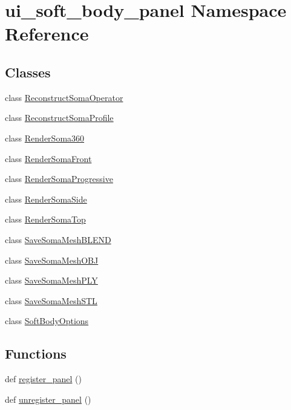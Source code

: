 \hypertarget{namespaceui__soft__body__panel}{}\section{ui\+\_\+soft\+\_\+body\+\_\+panel Namespace Reference}
\label{namespaceui__soft__body__panel}
\subsection*{Classes}
\begin{DoxyCompactItemize}
\item 
class \hyperlink{classui__soft__body__panel_1_1ReconstructSomaOperator}{Reconstruct\+Soma\+Operator}
\item 
class \hyperlink{classui__soft__body__panel_1_1ReconstructSomaProfile}{Reconstruct\+Soma\+Profile}
\item 
class \hyperlink{classui__soft__body__panel_1_1RenderSoma360}{Render\+Soma360}
\item 
class \hyperlink{classui__soft__body__panel_1_1RenderSomaFront}{Render\+Soma\+Front}
\item 
class \hyperlink{classui__soft__body__panel_1_1RenderSomaProgressive}{Render\+Soma\+Progressive}
\item 
class \hyperlink{classui__soft__body__panel_1_1RenderSomaSide}{Render\+Soma\+Side}
\item 
class \hyperlink{classui__soft__body__panel_1_1RenderSomaTop}{Render\+Soma\+Top}
\item 
class \hyperlink{classui__soft__body__panel_1_1SaveSomaMeshBLEND}{Save\+Soma\+Mesh\+B\+L\+E\+ND}
\item 
class \hyperlink{classui__soft__body__panel_1_1SaveSomaMeshOBJ}{Save\+Soma\+Mesh\+O\+BJ}
\item 
class \hyperlink{classui__soft__body__panel_1_1SaveSomaMeshPLY}{Save\+Soma\+Mesh\+P\+LY}
\item 
class \hyperlink{classui__soft__body__panel_1_1SaveSomaMeshSTL}{Save\+Soma\+Mesh\+S\+TL}
\item 
class \hyperlink{classui__soft__body__panel_1_1SoftBodyOptions}{Soft\+Body\+Options}
\end{DoxyCompactItemize}
\subsection*{Functions}
\begin{DoxyCompactItemize}
\item 
def \hyperlink{namespaceui__soft__body__panel_a865a3ef936900187ed9a28a5d929bb41}{register\+\_\+panel} ()
\item 
def \hyperlink{namespaceui__soft__body__panel_a6d3d285538bbac0959fda5d7413ae2bc}{unregister\+\_\+panel} ()
\end{DoxyCompactItemize}

